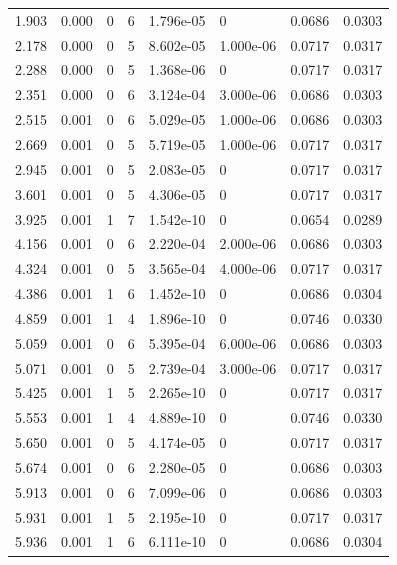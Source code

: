 \documentclass[preview]{standalone}
\begin{document}
{{\begin{tabular}{L{1.2cm}C{1.2cm} C{0.3cm}C{0.5cm} C{1.4cm}C{1.4cm} C{1.4cm}C{1.4cm}}
  1.903  &  0.000  & 0     &  6 &  1.796e-05  & 0  & 0.0686 &  0.0303   \\ 
  2.178  &  0.000  & 0     &  5 &  8.602e-05  & 1.000e-06  & 0.0717 &  0.0317   \\ 
  2.288  &  0.000  & 0     &  5 &  1.368e-06  & 0  & 0.0717 &  0.0317   \\ 
  2.351  &  0.000  & 0     &  6 &  3.124e-04  & 3.000e-06  & 0.0686 &  0.0303   \\ 
  2.515  &  0.001  & 0     &  6 &  5.029e-05  & 1.000e-06  & 0.0686 &  0.0303   \\ 
  2.669  &  0.001  & 0     &  5 &  5.719e-05  & 1.000e-06  & 0.0717 &  0.0317   \\ 
  2.945  &  0.001  & 0     &  5 &  2.083e-05  & 0  & 0.0717 &  0.0317   \\ 
  3.601  &  0.001  & 0     &  5 &  4.306e-05  & 0  & 0.0717 &  0.0317   \\ 
  3.925  &  0.001  & 1     &  7 &  1.542e-10  & 0  & 0.0654 &  0.0289   \\ 
  4.156  &  0.001  & 0     &  6 &  2.220e-04  & 2.000e-06  & 0.0686 &  0.0303   \\ 
  4.324  &  0.001  & 0     &  5 &  3.565e-04  & 4.000e-06  & 0.0717 &  0.0317   \\ 
  4.386  &  0.001  & 1     &  6 &  1.452e-10  & 0  & 0.0686 &  0.0304   \\ 
  4.859  &  0.001  & 1     &  4 &  1.896e-10  & 0  & 0.0746 &  0.0330   \\ 
  5.059  &  0.001  & 0     &  6 &  5.395e-04  & 6.000e-06  & 0.0686 &  0.0303   \\ 
  5.071  &  0.001  & 0     &  5 &  2.739e-04  & 3.000e-06  & 0.0717 &  0.0317   \\ 
  5.425  &  0.001  & 1     &  5 &  2.265e-10  & 0  & 0.0717 &  0.0317   \\ 
  5.553  &  0.001  & 1     &  4 &  4.889e-10  & 0  & 0.0746 &  0.0330   \\ 
  5.650  &  0.001  & 0     &  5 &  4.174e-05  & 0  & 0.0717 &  0.0317   \\ 
  5.674  &  0.001  & 0     &  6 &  2.280e-05  & 0  & 0.0686 &  0.0303   \\ 
  5.913  &  0.001  & 0     &  6 &  7.099e-06  & 0  & 0.0686 &  0.0303   \\ 
  5.931  &  0.001  & 1     &  5 &  2.195e-10  & 0  & 0.0717 &  0.0317   \\ 
  5.936  &  0.001  & 1     &  6 &  6.111e-10  & 0  & 0.0686 &  0.0304   \\ 

\end{tabular}}}
\end{document}

